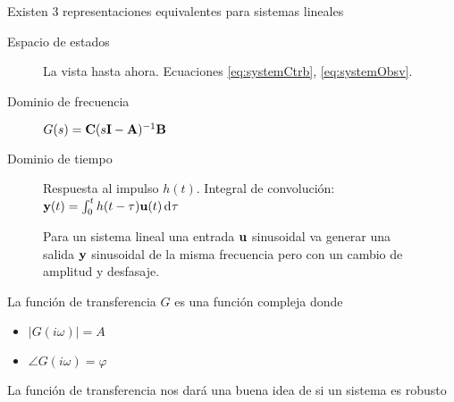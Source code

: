Existen 3 representaciones equivalentes para sistemas lineales
\begin{description}
	\item[Espacio de estados]  La vista hasta ahora. Ecuaciones \eqref{eq:systemCtrb}, \eqref{eq:systemObsv}.
	\item[Dominio de frecuencia] $G(s) = \mathbf{C} (s\mathbf{I} -\mathbf{A})^{-1}\mathbf{B}$
	\item[Dominio de tiempo	] Respuesta al impulso $h(t)$. Integral de convolución: $\Cy(t) = \int_0^t h(t-\tau)\Cu(t) \diff \tau$
\end{description}


\begin{figure}[htb!]
	\centering
{}
\caption{Para un sistema lineal una entrada $\mathbf{u}$ sinusoidal va generar una salida $\mathbf{y}$ sinusoidal de la misma frecuencia pero con un cambio de amplitud y desfasaje.}
\end{figure}

La función de transferencia $G$ es una función compleja donde
\begin{itemize}
\item $|G(i\omega)|=A$
\item $\angle G(i\omega) = \varphi$
\end{itemize} 

La función de transferencia nos dará una buena idea de si un sistema es robusto 

